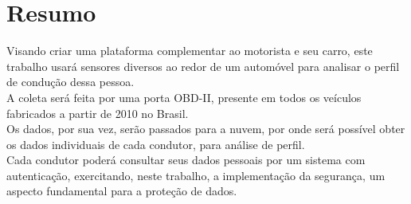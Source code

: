 \chapter*{Resumo}

\noindent Visando criar uma plataforma complementar ao motorista e seu carro, este trabalho usará sensores diversos ao redor de um automóvel para analisar o perfil de condução dessa pessoa.\\
A coleta será feita por uma porta OBD-II, presente em todos os veículos fabricados a partir de 2010 no Brasil.\\ 
Os dados, por sua vez, serão passados para a nuvem, por onde será possível obter os dados individuais de cada condutor, para análise de perfil.\\ 
Cada condutor poderá consultar seus dados pessoais por um sistema com autenticação, exercitando, neste trabalho, a implementação da segurança, um aspecto fundamental para a proteção de dados.
